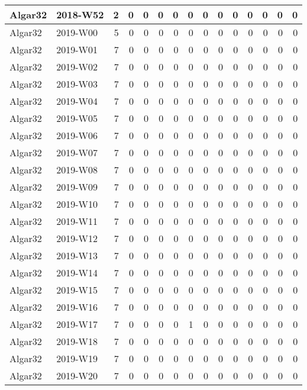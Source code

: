 \documentclass[]{book}
\begin{document}
\begin{table}
\begin{tabular}[t]{l|l|r|r|r|r|r|r|r|r|r|r|r|r|r}
\hline
Algar32 & 2018-W52 & 2 & 0 & 0 & 0 & 0 & 0 & 0 & 0 & 0 & 0 & 0 & 0 & 0\\
\hline
Algar32 & 2019-W00 & 5 & 0 & 0 & 0 & 0 & 0 & 0 & 0 & 0 & 0 & 0 & 0 & 0\\
\hline
Algar32 & 2019-W01 & 7 & 0 & 0 & 0 & 0 & 0 & 0 & 0 & 0 & 0 & 0 & 0 & 0\\
\hline
Algar32 & 2019-W02 & 7 & 0 & 0 & 0 & 0 & 0 & 0 & 0 & 0 & 0 & 0 & 0 & 0\\
\hline
Algar32 & 2019-W03 & 7 & 0 & 0 & 0 & 0 & 0 & 0 & 0 & 0 & 0 & 0 & 0 & 0\\
\hline
Algar32 & 2019-W04 & 7 & 0 & 0 & 0 & 0 & 0 & 0 & 0 & 0 & 0 & 0 & 0 & 0\\
\hline
Algar32 & 2019-W05 & 7 & 0 & 0 & 0 & 0 & 0 & 0 & 0 & 0 & 0 & 0 & 0 & 0\\
\hline
Algar32 & 2019-W06 & 7 & 0 & 0 & 0 & 0 & 0 & 0 & 0 & 0 & 0 & 0 & 0 & 0\\
\hline
Algar32 & 2019-W07 & 7 & 0 & 0 & 0 & 0 & 0 & 0 & 0 & 0 & 0 & 0 & 0 & 0\\
\hline
Algar32 & 2019-W08 & 7 & 0 & 0 & 0 & 0 & 0 & 0 & 0 & 0 & 0 & 0 & 0 & 0\\
\hline
Algar32 & 2019-W09 & 7 & 0 & 0 & 0 & 0 & 0 & 0 & 0 & 0 & 0 & 0 & 0 & 0\\
\hline
Algar32 & 2019-W10 & 7 & 0 & 0 & 0 & 0 & 0 & 0 & 0 & 0 & 0 & 0 & 0 & 0\\
\hline
Algar32 & 2019-W11 & 7 & 0 & 0 & 0 & 0 & 0 & 0 & 0 & 0 & 0 & 0 & 0 & 0\\
\hline
Algar32 & 2019-W12 & 7 & 0 & 0 & 0 & 0 & 0 & 0 & 0 & 0 & 0 & 0 & 0 & 0\\
\hline
Algar32 & 2019-W13 & 7 & 0 & 0 & 0 & 0 & 0 & 0 & 0 & 0 & 0 & 0 & 0 & 0\\
\hline
Algar32 & 2019-W14 & 7 & 0 & 0 & 0 & 0 & 0 & 0 & 0 & 0 & 0 & 0 & 0 & 0\\
\hline
Algar32 & 2019-W15 & 7 & 0 & 0 & 0 & 0 & 0 & 0 & 0 & 0 & 0 & 0 & 0 & 0\\
\hline
Algar32 & 2019-W16 & 7 & 0 & 0 & 0 & 0 & 0 & 0 & 0 & 0 & 0 & 0 & 0 & 0\\
\hline
Algar32 & 2019-W17 & 7 & 0 & 0 & 0 & 0 & 1 & 0 & 0 & 0 & 0 & 0 & 0 & 0\\
\hline
Algar32 & 2019-W18 & 7 & 0 & 0 & 0 & 0 & 0 & 0 & 0 & 0 & 0 & 0 & 0 & 0\\
\hline
Algar32 & 2019-W19 & 7 & 0 & 0 & 0 & 0 & 0 & 0 & 0 & 0 & 0 & 0 & 0 & 0\\
\hline
Algar32 & 2019-W20 & 7 & 0 & 0 & 0 & 0 & 0 & 0 & 0 & 0 & 0 & 0 & 0 & 0\\

\end{tabular}
\end{table}
\end{document}
